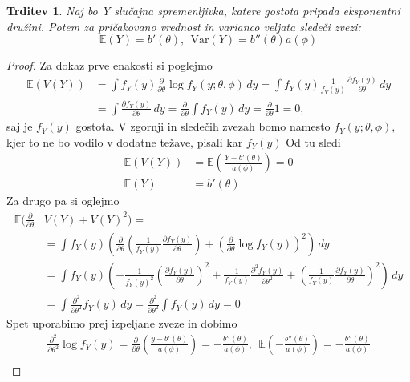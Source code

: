 \documentclass[12pt,a4paper]{amsart}
\theoremstyle{definition} %
\theoremstyle{plain} %
\newtheorem{trditev}[definicija]{Trditev}
\begin{document}
\begin{trditev} \label{izp}
    Naj bo Y slučajna spremenljivka, katere gostota pripada eksponentni družini. Potem za pričakovano vrednost in varianco veljata sledeči zvezi:
    \[
        \mathbb{E}(Y) = b'(\theta),~~\mathrm{Var}(Y) = b''(\theta)a(\phi)
    \]
\end{trditev}
\begin{proof}
Za dokaz prve enakosti si poglejmo
\begin{align*}
    \mathbb{E}(V(Y)) &= \int f_{Y}(y)\frac{\partial}{\partial \theta}\log f_{Y}(y;\theta,\phi) \,dy = \int f_{Y}(y)\frac{1}{f_{Y}(y)}\frac{\partial f_{Y}(y)}{\partial\theta}\,dy \nonumber\\
    &=\int\frac{\partial f_{Y}(y)}{\partial \theta} \,dy= \frac{\partial}{\partial \theta}\int f_{Y}(y)\,dy = \frac{\partial}{\partial \theta}1 = 0,
\end{align*}
saj je $f_{Y}(y)$ gostota. V zgornji in sledečih zvezah bomo namesto $f_{Y}(y;\theta,\phi),$ kjer to ne bo vodilo v dodatne težave, pisali kar $f_{Y}(y)$
Od tu sledi
\begin{align*}
    \mathbb{E}(V(Y)) &= \mathbb{E}\left(\frac{Y - b'(\theta)}{a(\phi)}\right) = 0 \\
    \mathbb{E}(Y) &= b'(\theta)
\end{align*}
Za drugo pa si oglejmo
\begin{align*}
    \mathbb{E}(\frac{\partial}{\partial\theta}&V(Y) + V(Y)^2) = \\
    & =\int f_{Y}(y)\left(\frac{\partial}{\partial \theta} \left(\frac{1}{f_{Y}(y)}\frac{\partial f_{Y}(y)}{\partial\theta}\right) + \left(\frac{\partial}{\partial\theta}\log f_{Y}(y)\right)^2\right) \,dy \\
    &=\int f_{Y}(y)\left(-\frac{1}{f_{Y}(y)^2}\left(\frac{\partial f_{Y}(y)}{\partial\theta}\right)^2 + \frac{1}{f_{Y}(y)}\frac{\partial^2f_{Y}(y)}{\partial\theta^2} + \left(\frac{1}{f_{Y}(y)}\frac{\partial f_{Y}(y)}{\partial\theta}\right)^2  \right)\,dy\\    
    &=\int \frac{\partial^2}{\partial\theta^2} f_{Y}(y) \,dy = \frac{\partial^2}{\partial\theta^2}\int f_{Y}(y)\,dy = 0
\end{align*}
Spet uporabimo prej izpeljane zveze in dobimo
\begin{gather*}
    \frac{\partial^2}{\partial\theta^2}\log f_{Y}(y) = \frac{\partial}{\partial\theta}\left(\frac{y-b'(\theta)}{a(\phi)}\right) = -\frac{b''(\theta)}{a(\phi)},~~\mathbb{E}\left(-\frac{b''(\theta)}{a(\phi)}\right) = -\frac{b''(\theta)}{a(\phi)} \\

\end{gather*}
\end{proof}
\end{document}
